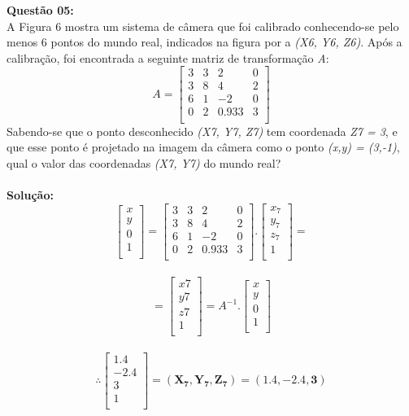 \vspace{1cm}
\noindent\textbf{Questão 05:}\\
A Figura 6 mostra um sistema de câmera que foi calibrado conhecendo-se pelo menos 6 pontos do mundo
real, indicados na figura por  a \emph{(X6, Y6, Z6)}. Após a calibração, foi encontrada a seguinte matriz de transformação \emph{A}:
\[
A = \begin{bmatrix}
    3&3&2&0\\
    3&8&4&2\\
    6&1&-2&0\\
    0&2&0.933&3\\
\end{bmatrix}
\]
Sabendo-se que o ponto desconhecido \emph{(X7, Y7, Z7)} tem coordenada \emph{Z7 = 3}, e que esse ponto é projetado
na imagem da câmera como o ponto \emph{(x,y) = (3,-1)}, qual o valor das coordenadas \emph{(X7, Y7)} do mundo real?\\
\\
\noindent\textbf{Solução:}
\\
\[
\begin{bmatrix}
    x\\
    y\\
    0\\
    1\\
\end{bmatrix} = 
\begin{bmatrix}
    3&3&2&0\\
    3&8&4&2\\
    6&1&-2&0\\
    0&2&0.933&3\\
\end{bmatrix}
.
\begin{bmatrix}
    x_{7}\\
    y_{7}\\
    z_{7}\\
    1\\
\end{bmatrix} =
\]
\\
\[
= \begin{bmatrix}
    x{7}\\
    y{7}\\
    z{7}\\
    1\\
\end{bmatrix} = 
A^{-1} . 
\begin{bmatrix}
    x\\
    y\\
    0\\
    1\\
\end{bmatrix}
\]
\\
\[
\therefore \begin{bmatrix}
    1.4\\
    -2.4\\
    3\\
    1\\
\end{bmatrix} = 
\mathbf{(X_{7},Y_{7},Z_{7}) = (1.4, -2.4, 3)}
\]


